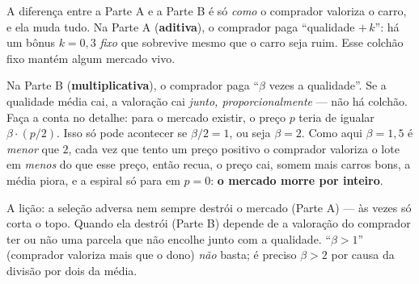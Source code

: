\documentclass[11pt,a4paper]{article}
\newcommand{\dc}[2]{#1{,}#2}
\begin{document}
\begin{enumerate}[leftmargin=2em,itemsep=4pt]
\begin{empalavras}
A diferença entre a Parte A e a Parte B é só \emph{como} o comprador valoriza o carro, e ela
muda tudo. Na Parte A (\textbf{aditiva}), o comprador paga ``qualidade $+\,k$'': há um bônus
$k = \dc{0}{3}$ \emph{fixo} que sobrevive mesmo que o carro seja ruim. Esse colchão fixo
mantém algum mercado vivo.

\smallskip\noindent
Na Parte B (\textbf{multiplicativa}), o comprador paga ``$\beta$ vezes a qualidade''. Se a
qualidade média cai, a valoração cai \emph{junto, proporcionalmente} — não há colchão. Faça
a conta no detalhe: para o mercado existir, o preço $p$ teria de igualar $\beta \cdot
(p/2)$. Isso só pode acontecer se $\beta/2 = 1$, ou seja $\beta = 2$. Como aqui $\beta =
\dc{1}{5}$ é \emph{menor} que $2$, cada vez que tento um preço positivo o comprador valoriza
o lote em \emph{menos} do que esse preço, então recua, o preço cai, somem mais carros bons,
a média piora, e a espiral só para em $p = 0$: \textbf{o mercado morre por inteiro}.

\smallskip\noindent
A lição: a seleção adversa nem sempre destrói o mercado (Parte A) — às vezes só corta o
topo. Quando ela destrói (Parte B) depende de a valoração do comprador ter ou não uma
parcela que não encolhe junto com a qualidade. ``$\beta > 1$'' (comprador valoriza mais que
o dono) \emph{não} basta; é preciso $\beta > 2$ por causa da divisão por dois da média.
\end{empalavras}

\end{enumerate}
\end{document}
